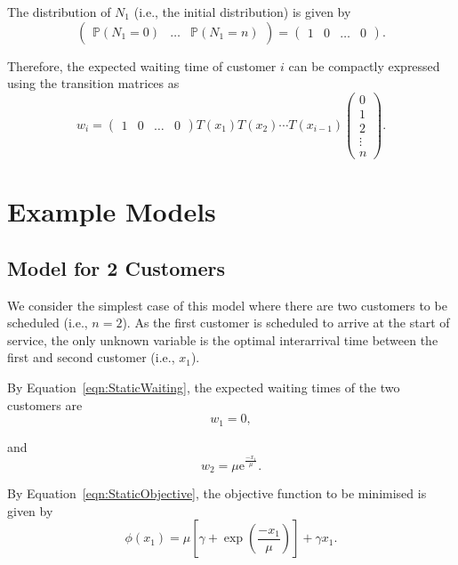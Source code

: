 The distribution of $N_{1}$ (i.e., the initial distribution) is given by
\begin{equation}
	\left( \begin{array}{ccc} \mathbb{P} (N_{1} = 0) & \ldots & \mathbb{P} (N_{1} = n) \end{array} \right) = \left( \begin{array}{cccc} 1 & 0 & \ldots & 0 \end{array} \right).
\end{equation}

Therefore, the expected waiting time of customer $i$ can be compactly expressed using the transition matrices as
\begin{equation}
	w_{i}
	= \left( \begin{array}{cccc} 1 & 0 & \ldots & 0 \end{array} \right)
	T (x_{1}) T (x_{2}) \cdots T (x_{i - 1})
	\left( \begin{array}{c} 0 \\ 1 \\ 2 \\ \vdots \\ n \end{array} \right).
	\label{eqn:StaticWaiting}
\end{equation}

\section{Example Models}
\subsection{Model for 2 Customers}
\label{sec:StaticTwoCust}
We consider the simplest case of this model where there are two customers to be scheduled (i.e., $n = 2$). As the first customer is scheduled to arrive at the start of service, the only unknown variable is the optimal interarrival time between the first and second customer (i.e., $x_{1}$).

By Equation~\ref{eqn:StaticWaiting}, the expected waiting times of the two customers are
\begin{equation}
	w_{1} = 0,
\end{equation}

and
\begin{equation}
	w_{2} = \mu \mathrm{e}^{\frac{- x_{1}}{\mu}}.
\end{equation}

By Equation~\ref{eqn:StaticObjective}, the objective function to be minimised is given by
\begin{equation}
	\phi (x_{1}) = \mu \left[ \gamma + \exp \left( \frac{- x_{1}}{\mu} \right) \right] + \gamma x_{1}.
\end{equation}

